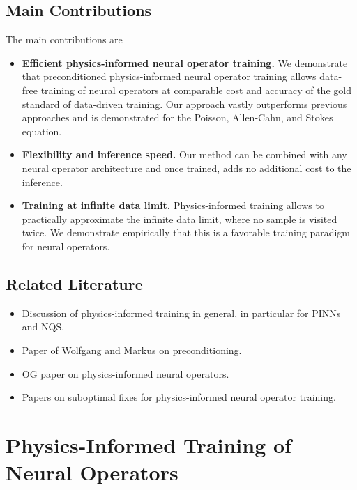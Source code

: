 \documentclass{article} %
\begin{document}
\subsection{Main Contributions} The main contributions are
\begin{itemize}
   \item \textbf{Efficient physics-informed neural operator training.} We demonstrate that preconditioned physics-informed neural operator training allows data-free training of neural operators at comparable cost and accuracy of the gold standard of data-driven training. Our approach vastly outperforms previous approaches and is demonstrated for the Poisson, Allen-Cahn, and Stokes equation.
   \item \textbf{Flexibility and inference speed.} Our method can be combined with any neural operator architecture and once trained, adds no additional cost to the inference.
   \item \textbf{Training at infinite data limit.} Physics-informed training allows to practically approximate the infinite data limit, where no sample is visited twice. We demonstrate empirically that this is a favorable training paradigm for neural operators.
\end{itemize}

\subsection{Related Literature}
\begin{itemize}
    \item Discussion of physics-informed training in general, in particular for PINNs and NQS.
    \item Paper of Wolfgang and Markus on preconditioning.
    \item OG paper on physics-informed neural operators.
    \item Papers on suboptimal fixes for physics-informed neural operator training.
\end{itemize}

\section{Physics-Informed Training of Neural Operators}
\end{document}
